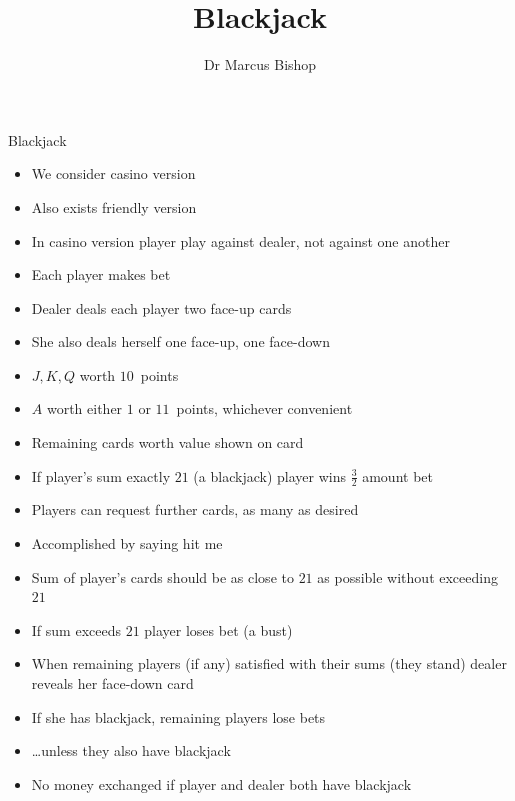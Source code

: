 \documentclass{beamer}
\title[Blackjack]{Blackjack}
\author{Dr Marcus Bishop}
\theoremstyle{definition}
\begin{document}
\begin{frame}\titlepage\end{frame}
\LogoOff

\begin{frame}{Blackjack}
\begin{itemize}
\item We consider casino version
\item Also exists friendly version
\item In casino version player play against dealer, not against one another
\item Each player makes bet
\item Dealer deals each player two face-up cards
\item She also deals herself one face-up, one face-down
\item $J,K,Q$ worth $10$~points
\item $A$ worth either $1$ or $11$~points, whichever convenient
\item Remaining cards worth value shown on card
\end{itemize}
\end{frame}

\begin{frame}
\begin{itemize}
\item If player's sum exactly $21$ (a \alert{blackjack}) player wins
$\frac{3}{2}$ amount bet
\item Players can request further cards, as many as desired
\item Accomplished by saying \alert{hit me}
\item Sum of player's cards should be as close to $21$ as possible
without exceeding $21$
\item If sum exceeds $21$ player loses bet (a \alert{bust})
\item When remaining players (if any) satisfied with their sums
(they \alert{stand}) dealer reveals her
face-down card
\item If she has blackjack, remaining players lose bets
\item \dots unless they also have blackjack
\item No money exchanged if player and dealer both have blackjack
\end{itemize}
\end{frame}
\end{document}
